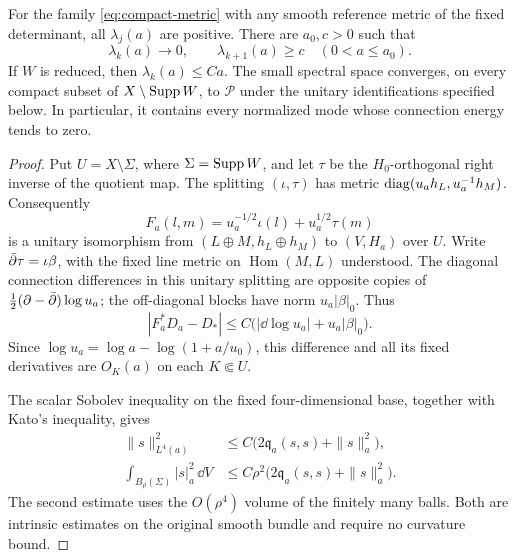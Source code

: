 \begin{proposition}\label{prop:weak-spectrum}
For the family \eqref{eq:compact-metric} with any smooth reference
metric of the fixed determinant, all \(\lambda_j(a)\) are positive.
There are \(a_0,c>0\) such that
\begin{equation}\label{eq:complete-cluster}
 \lambda_k(a)\longrightarrow0,\qquad
 \lambda_{k+1}(a)\ge c\quad(0<a\le a_0).
\end{equation}
If \(W\) is reduced, then \(\lambda_k(a)\le Ca\).
The small spectral space converges, on every compact subset of
\(X\setminus\operatorname{Supp} W\), to \(\mathcal P\) under the unitary
identifications specified below. In particular, it contains every
normalized mode whose connection energy tends to zero.
\end{proposition}

\begin{proof}
Put \(U=X\setminus\Sigma\), where \(\Sigma=\operatorname{Supp} W\), and let \(\tau\)
be the \(H_0\)-orthogonal right inverse of the quotient map.
The splitting \((\iota,\tau)\) has metric
\(\operatorname{diag}(u_ah_L,u_a^{-1}h_M)\). Consequently
\begin{equation}\label{eq:graded-unitary-map}
 F_a(l,m)=u_a^{-1/2}\iota(l)+u_a^{1/2}\tau(m)
\end{equation}
is a unitary isomorphism from \((L\oplus M,h_L\oplus h_M)\) to
\((V,H_a)\) over \(U\). Write \(\bar\partial\tau=\iota\beta\), with the
fixed line metric on \(\operatorname{Hom}(M,L)\) understood.
The diagonal connection differences in this unitary splitting are
opposite copies of
\(\frac12(\partial-\bar\partial)\log u_a\); the off-diagonal blocks have
norm \(u_a|\beta|_0\). Thus
\begin{equation}\label{eq:graded-connection-error}
 |F_a^*D_a-D_*|
 \le C\bigl(|\dd\log u_a|+u_a|\beta|_0\bigr).
\end{equation}
Since \(\log u_a=\log a-\log(1+a/u_0)\), this difference and all
its fixed derivatives are \(O_K(a)\) on each \(K\Subset U\).

The scalar Sobolev inequality on the fixed four-dimensional base,
together with Kato's inequality, gives
\begin{align}
 \|s\|_{L^4(a)}^2
 &\le C\bigl(2\mathfrak q_a(s,s)+\|s\|_a^2\bigr),
                                                   \label{eq:uniform-sobolev}\\
 \int_{B_\rho(\Sigma)}|s|_a^2\,\dd V
 &\le C\rho^2\bigl(2\mathfrak q_a(s,s)+\|s\|_a^2\bigr).
                                                   \label{eq:no-point-mass}
\end{align}
The second estimate uses the \(O(\rho^4)\) volume of the finitely
many balls. Both are intrinsic estimates on the original smooth
bundle and require no curvature bound.


\end{proof}
